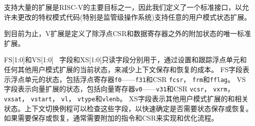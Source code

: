 \iffalse
Supporting substantial extensions is one of the primary goals of
RISC-V, and hence we define a standard interface to allow unchanged
privileged-mode code, particularly a supervisor-level OS, to support
arbitrary user-mode state extensions.
\fi

支持大量的扩展是RISC-V的主要目标之一，因此我们定义了一个标准接口，以允许未更改的特权模式代码(特别是监管级操作系统)支持任意的用户模式状态扩展。

\iffalse
\begin{commentary}
  To date, the V extension is the only standard extension that defines
  additional state beyond the floating-point CSR and data registers.
\end{commentary}
\fi

\begin{commentary}
到目前为止，V扩展是定义了除浮点CSR和数据寄存器之外的附加状态的唯一标准扩展。
\end{commentary}

\iffalse
The FS[1:0] and VS[1:0] \warl\ fields and the XS[1:0] read-only field are used
to reduce the cost of context save and restore by setting and tracking
the current state of the floating-point unit and any other user-mode
extensions respectively.
The FS field encodes the status of the floating-point unit state, including
the floating-point registers {\tt f0}--{\tt f31} and the CSRs
{\tt fcsr}, {\tt frm}, and {\tt fflags}.
The VS field encodes the status of the vector extension state, including
the vector registers {\tt v0}--{\tt v31} and the CSRs
{\tt vcsr}, {\tt vxrm}, {\tt vxsat}, {\tt vstart}, {\tt vl}, {\tt vtype},
and {\tt vlenb}.
The XS field encodes the
status of additional user-mode extensions and associated state.
These fields can be checked by a context switch routine to quickly
determine whether a state save or restore is required.  If a save or
restore is required, additional instructions and CSRs are typically
required to effect and optimize the process.
\fi

FS[1:0]和VS[1:0] \warl\ 字段和XS[1:0]只读字段分别用于，通过设置和跟踪浮点单元和任何其他用户模式扩展的当前状态，来减少上下文保存和恢复的成本。
FS字段表示浮点单元的状态，包括浮点寄存器{\tt f0}——{\tt f31}和CSR {\tt fcsr}， {\tt frm}和{\tt fflag}。
VS字段表示向量扩展的状态，包括向量寄存器{\tt v0}——{\tt v31}和CSR {\tt vcsr}， {\tt vxrm}， {\tt vxsat}， {\tt vstart}， {\tt vl}， {\tt vtype}和{\tt vlenb}。
XS字段表示其他用户模式扩展的和相关状态。上下文切换例程可以检查这些字段，以快速确定是否需要状态保存或恢复。
如果需要保存或恢复，通常需要附加的指令和CSR来实现和优化流程。

